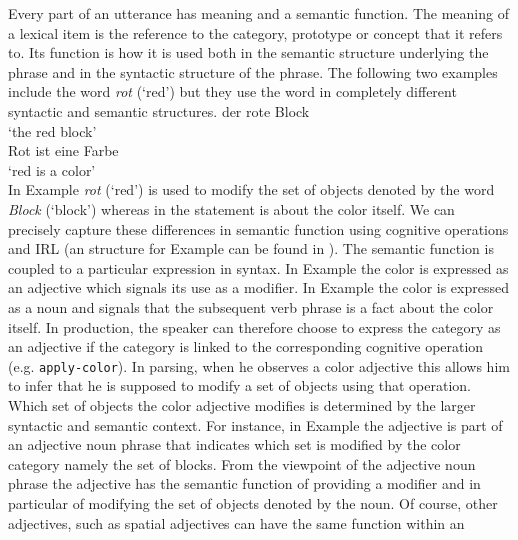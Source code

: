 Every part of an utterance has meaning and a semantic function. The 
meaning of a lexical item is the reference to the category, prototype 
or concept that it refers to. Its function is how it is used both 
in the semantic structure underlying the phrase  and in the
syntactic structure of the phrase. The following two examples
include the word \textit{rot} (`red') but they use the word in completely 
different syntactic and semantic structures.
\ea\label{ex:4:1}
der rote Block\\
\glt `the red block'\\
\z
\ea\label{ex:4:2}
Rot ist eine Farbe\\
\glt `red is a color'\\
\z
In Example  \textit{rot} (`red') is used to modify the set of objects
denoted by the word \textit{Block} (`block') whereas in  the
statement is about the color itself. We can precisely capture 
these differences in semantic function using cognitive operations
and IRL (an structure for Example  can be found in ). 
The semantic function is coupled to a particular expression
in syntax. In Example  the color is expressed
as an adjective which signals its use as a modifier.  
In Example  the color is expressed as a noun and
signals that the subsequent verb phrase is a fact about the color itself. 
In production, the speaker can therefore choose to express
the category as an adjective if the category is linked to the corresponding
cognitive operation (e.g. {\footnotesize\tt apply-color}). In parsing, when
he observes a color adjective this allows him to infer
that he is supposed to modify a set of objects using that operation.
Which set of objects the color adjective modifies is determined
by the larger syntactic and semantic context. For instance, in Example
 the adjective is part of an adjective noun phrase that 
indicates which set is modified by the color category namely
the set of blocks. From the viewpoint of the adjective noun phrase
the adjective has the semantic function of providing a modifier and in 
particular of modifying the set of objects denoted by the noun. Of course, other adjectives,
such as spatial adjectives can have the same function within an 

